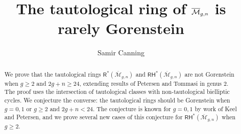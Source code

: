 \documentclass[12pt]{amsart}
\title{The tautological ring of $\Mb_{g,n}$ is rarely Gorenstein}
\author{Samir Canning}
\theoremstyle{definition}
\newcommand{\R}{\mathsf{R}}
\newcommand{\RH}{\mathsf{RH}}
\newcommand{\M}{\mathcal{M}}
\newcommand{\Mb}{\overline{\M}}
\begin{document}
\begin{abstract}
We prove that the tautological rings $\R^*(\Mb_{g,n})$ and $\RH^*(\Mb_{g,n})$ are not Gorenstein when $g\geq 2$ and $2g+n\geq 24$, extending results of Petersen and Tommasi in genus $2$. The proof uses the intersection of tautological classes with non-tautological bielliptic cycles. We conjecture the converse: the tautological rings should be Gorenstein when $g=0,1$ or $g\geq 2$ and $2g+n<24$. The conjecture is known for $g=0,1$ by work of Keel and Petersen, and we prove several new cases of this conjecture for $\RH^*(\Mb_{g,n})$ when $g\geq 2$.
\end{abstract}

\maketitle
\end{document}
